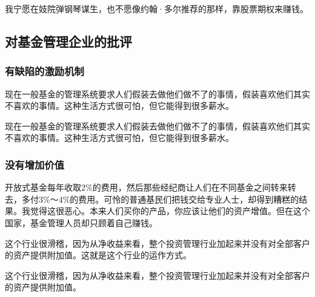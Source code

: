 \begin{WisdomBox}
\par

我宁愿在妓院弹钢琴谋生，也不愿像约翰·多尔推荐的那样，靠股票期权来赚钱。
\par
\end{WisdomBox}

\subsection*{对基金管理企业的批评}

\subsubsection*{有缺陷的激励机制}

现在一般基金的管理系统要求人们假装去做他们做不了的事情，假装喜欢他们其实不喜欢的事情。这种生活方式很可怕，但它能得到很多薪水。
\par

\begin{WisdomBox}
\par

现在一般基金的管理系统要求人们假装去做他们做不了的事情，假装喜欢他们其实不喜欢的事情。这种生活方式很可怕，但它能得到很多薪水。
\par
\end{WisdomBox}

\subsubsection*{没有增加价值}

开放式基金每年收取2\%的费用，然后那些经纪商让人们在不同基金之间转来转去，多付3\%～4\%的费用。可怜的普通基民们把钱交给专业人士，却得到糟糕的结果。我觉得这很恶心。本来人们买你的产品，你应该让他们的资产增值。但在这个国家，基金管理人员却只顾着自己赚钱。
\par

这个行业很滑稽，因为从净收益来看，整个投资管理行业加起来并没有对全部客户的资产提供附加值。这就是这个行业的运作方式。
\par

\begin{WisdomBox}
\par

这个行业很滑稽，因为从净收益来看，整个投资管理行业加起来并没有对全部客户的资产提供附加值。
\par
\end{WisdomBox}

